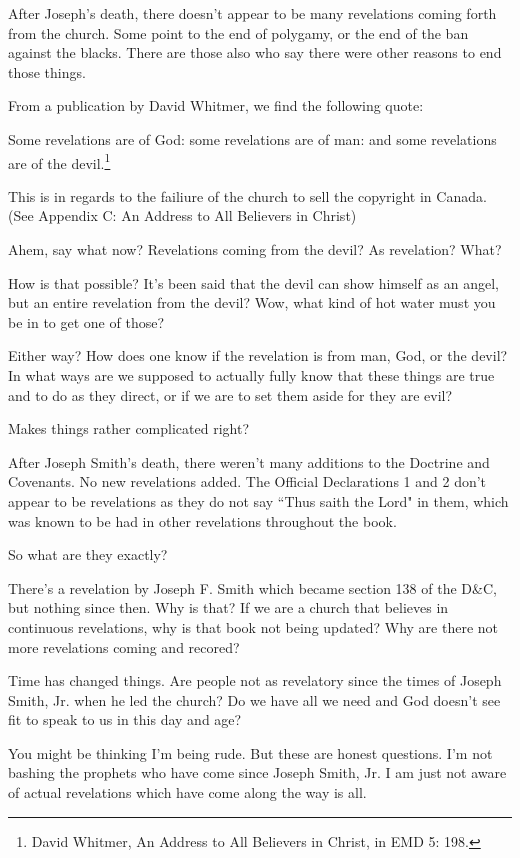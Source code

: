 \documentclass{article}
\begin{document}
After Joseph's death, there doesn't appear to be many revelations coming forth
from the church. Some point to the end of polygamy, or the end of the ban 
against the blacks. There are those also who say there were other reasons
to end those things.

From a publication by David Whitmer, we find the following quote:

\begin{displayquote}
Some revelations are of God: 
some revelations are of man: 
and some revelations are of the devil.\footnote{David Whitmer, 
An Address to All Believers in Christ, in EMD 5: 198.}
\end{displayquote}

This is in regards to the failiure of the church to sell the copyright in
Canada. (See Appendix C: An Address to All Believers in Christ)

Ahem, say what now? Revelations coming from the devil? As revelation? What?

How is that possible? It's been said that the devil can show himself as an 
angel, but an entire revelation from the devil? Wow, what kind of hot water
must you be in to get one of those?

Either way? How does one know if the revelation is from man, God, or the devil?
In what ways are we supposed to actually fully know that these things are
true and to do as they direct, or if we are to set them aside for they are evil?

Makes things rather complicated right?

After Joseph Smith's death, there weren't many additions to the Doctrine and
Covenants. No new revelations added. The Official Declarations 1 and 2 don't
appear to be revelations as they do not say ``Thus saith the Lord" in them,
which was known to be had in other revelations throughout the book.

So what are they exactly?

There's a revelation by Joseph F. Smith which became section 138 of the D\&C,
but nothing since then. Why is that? If we are a church that believes in
continuous revelations, why is that book not being updated? Why are there
not more revelations coming and recored?

Time has changed things. Are people not as revelatory since the times of
Joseph Smith, Jr. when he led the church? Do we have all we need and God doesn't
see fit to speak to us in this day and age?

You might be thinking I'm being rude. But these are honest questions. I'm not
bashing the prophets who have come since Joseph Smith, Jr. I am just not aware
of actual revelations which have come along the way is all.
\end{document}

